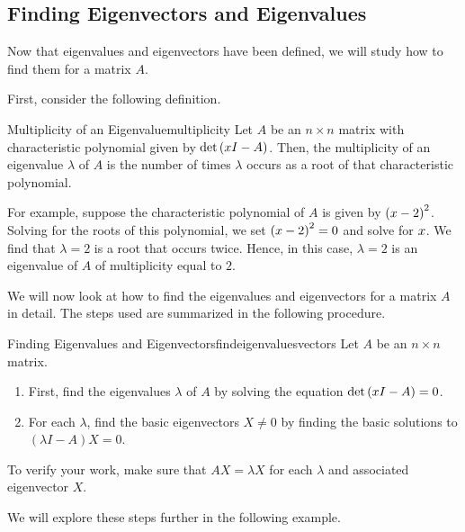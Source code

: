 \subsection{Finding Eigenvectors and Eigenvalues}

Now that eigenvalues and eigenvectors have been defined, we will study how to find
 them for a matrix $A$. 

First, consider the following definition.

\begin{definition}{Multiplicity of an Eigenvalue}{multiplicity}
Let $A$ be an $n \times n$ matrix with characteristic polynomial given by 
$\det \left( x I -  A\right)$. Then, the multiplicity of an eigenvalue $\lambda$ of $A$
is the number of times $\lambda$ occurs as a root of that characteristic polynomial.
\end{definition}

For example, suppose the characteristic polynomial of $A$ is given by
$\left( x - 2 \right)^2$. Solving for the roots of this
polynomial, we set $\left( x - 2 \right)^2 = 0$ and solve for
$x$.  We find that $\lambda = 2$ is a root that occurs
twice. Hence, in this case, $\lambda = 2$ is an eigenvalue of $A$ of
multiplicity equal to $2$.

We will now look at how to find the eigenvalues and eigenvectors for a
matrix $A$ in detail.  The steps used are summarized in the following
procedure.

\begin{procedure}{Finding Eigenvalues and Eigenvectors}{findeigenvaluesvectors}
%
Let $A$ be an $n \times n$ matrix. 
\begin{enumerate}
\item First, find the eigenvalues $\lambda$ of $A$ by solving the equation $\det \left( x I -A \right) = 0$. 

\item For each $\lambda$, find the basic eigenvectors $X \neq 0$ by finding the basic solutions to  $\left( \lambda I - A \right) X = 0$.
\end{enumerate}

To verify your work, make sure that $AX=\lambda X$
for each $\lambda$ and associated eigenvector $X$.
\end{procedure}

We will explore these steps further in the following example.

